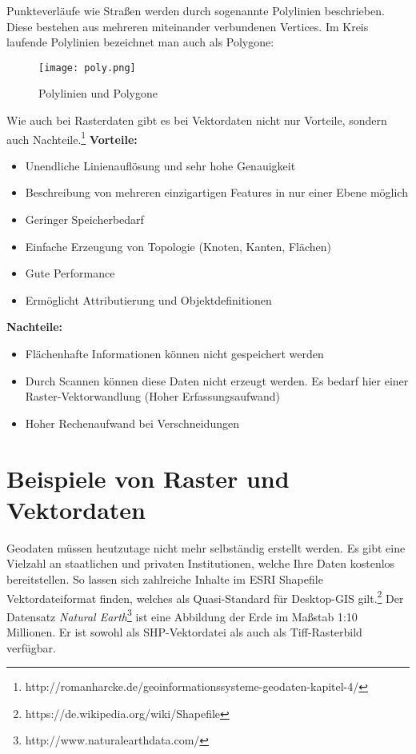 \documentclass[11pt,fleqn]{book}
\begin{document}

Punkteverläufe wie Straßen werden durch sogenannte Polylinien beschrieben. Diese bestehen aus mehreren miteinander verbundenen Vertices. Im Kreis laufende Polylinien bezeichnet man auch als Polygone:

\begin{figure}[h]
\centering
\texttt{[image: poly.png]}
\caption{Polylinien und Polygone \protect\footnotemark}
\end{figure}


Wie auch bei Rasterdaten gibt es bei Vektordaten nicht nur Vorteile, sondern auch Nachteile.\footnote{http://romanharcke.de/geoinformationssysteme-geodaten-kapitel-4/}\newline
\textbf{Vorteile:}
\begin{itemize}
\item Unendliche Linienauflösung und sehr hohe Genauigkeit
\item Beschreibung von mehreren einzigartigen Features in nur einer Ebene möglich
\item Geringer Speicherbedarf
\item Einfache Erzeugung von Topologie (Knoten, Kanten, Flächen)
\item Gute Performance
\item Ermöglicht Attributierung und Objektdefinitionen
\end{itemize}
\textbf{Nachteile:}
\begin{itemize}
\item Flächenhafte Informationen können nicht gespeichert werden 
\item Durch Scannen können diese Daten nicht erzeugt werden. Es bedarf hier einer Raster-Vektorwandlung (Hoher Erfassungsaufwand)
\item Hoher Rechenaufwand bei Verschneidungen
\end{itemize}

\section{Beispiele von Raster und Vektordaten}
Geodaten müssen heutzutage nicht mehr selbständig erstellt werden. Es gibt eine Vielzahl an staatlichen und privaten Institutionen, welche Ihre Daten kostenlos bereitstellen. So lassen sich zahlreiche Inhalte im ESRI Shapefile Vektordateiformat finden, welches als Quasi-Standard für Desktop-GIS gilt.\footnote{https://de.wikipedia.org/wiki/Shapefile}
Der Datensatz \textit{Natural Earth}\footnote{http://www.naturalearthdata.com/} ist eine Abbildung der Erde im Maßstab 1:10 Millionen. Er ist sowohl als SHP-Vektordatei als auch als Tiff-Rasterbild verfügbar.
\end{document}
